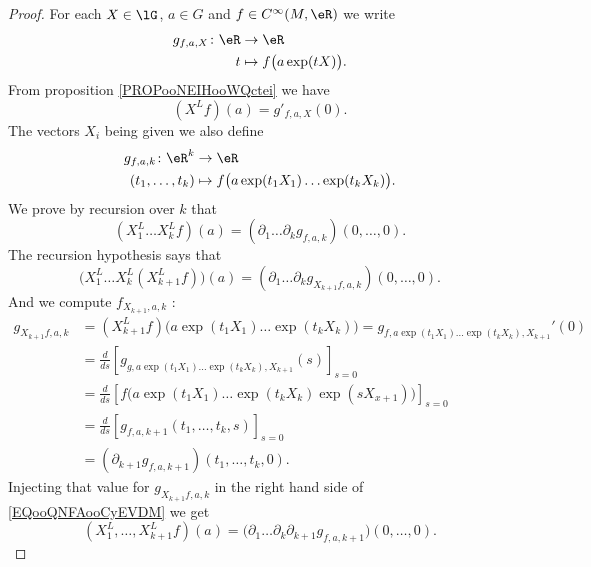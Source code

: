 \begin{theorem}
\begin{proof}
	For each \( X\in \lG\), \( a\in G\) and \( f\in C^{\infty}(M,\eR) \) we write
	\begin{equation}
		\begin{aligned}
			g_{f,a,X}\colon \eR & \to \eR                         \\
			t                   & \mapsto f\big( a\exp(tX) \big).
		\end{aligned}
	\end{equation}
	From proposition \ref{PROPooNEIHooWQctei} we have
	\begin{equation}
		(X^Lf)(a)=g'_{f,a,X}(0).
	\end{equation}
	The vectors \( X_i\) being given we also define
	\begin{equation}
		\begin{aligned}
			g_{f,a,k}\colon \eR^k & \to \eR                                                \\
			(t_1,\ldots,t_k)      & \mapsto f\big( a\exp(t_1X_1)\ldots \exp(t_kX_k) \big).
		\end{aligned}
	\end{equation}
	We prove by recursion over \( k\) that
	\begin{equation}
		(X_1^L\ldots X_k^Lf)(a)=(\partial_1\ldots \partial_kg_{f,a,k})(0,\ldots,0).
	\end{equation}
	The recursion hypothesis says that
	\begin{equation}		\label{EQooQNFAooCyEVDM}
		\Big( X_1^L\ldots X_k^L(X^L_{k+1}f) \Big)(a)=(\partial_1\ldots \partial_kg_{X_{k+1}f,a,k})(0,\ldots,0).
	\end{equation}
	And we compute \( f_{X_{k+1},a,k}\) :
	\begin{subequations}
		\begin{align}
			g_{X_{k+1}f,a,k} & =(X_{k+1}^Lf)\big( a\exp(t_1X_1)\ldots \exp(t_kX_k) \big)  = g_{f,a\exp(t_1X_1)\ldots \exp(t_kX_k),X_{k+1}}'(0) \\
			                 & = \frac{d}{ds} \left[ g_{g,a\exp(t_1X_1)\ldots \exp(t_kX_k),X_{k+1}}(s)  \right]_{s=0}                          \\
			                 & =\frac{d}{ds} \left[ f\Big( a\exp(t_1X_1)\ldots \exp(t_kX_k)\exp(sX_{x+1}) \Big)  \right]_{s=0}                 \\
			                 & =\frac{d}{ds} \left[ g_{f,a,k+1}(t_1,\ldots,t_k,s)  \right]_{s=0}                                               \\
			                 & =(\partial_{k+1}g_{f,a,k+1})(t_1,\ldots,t_k,0).
		\end{align}
	\end{subequations}
	Injecting that value for \( g_{X_{k+1}f,a,k}\) in the right hand side of \eqref{EQooQNFAooCyEVDM} we get
	\begin{equation}
		(X_1^L,\ldots,X_{k+1}^Lf)(a)=\big( \partial_1\ldots\partial_k\partial_{k+1}g_{f,a,k+1} \big)(0,\ldots,0).
	\end{equation}
\end{proof}


\end{theorem}
